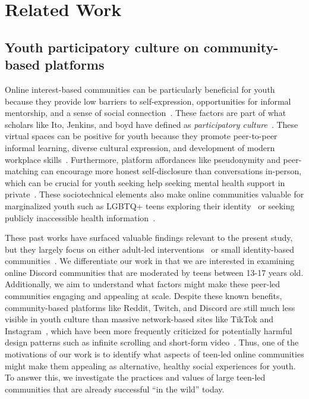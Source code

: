 \section{Related Work}
\subsection{Youth participatory culture on community-based platforms}
Online interest-based communities can be particularly beneficial for youth because they provide low barriers to self-expression, opportunities for informal mentorship, and a sense of social connection~\cite{ito2013hanging}. These factors are part of what scholars like Ito, Jenkins, and boyd have defined as \textit{participatory culture}~\cite{jenkins2015participatory}. These virtual spaces can be positive for youth because they promote peer-to-peer informal learning, diverse cultural expression, and development of modern workplace skills~\cite{ito2009living, fiesler2017growing, fields2014programming,brennan2010making, evans2017fanfiction}. Furthermore, platform affordances like pseudonymity and peer-matching can encourage more honest self-disclosure than conversations in-person, which can be crucial for youth seeking help seeking mental health support in private~\cite{bhattacharya2019teen, jin2023music, wadley2013participatory, fang2022peer}. These sociotechnical elements also make online communities valuable for marginalized youth such as LGBTQ+ teens exploring their identity~\cite{dym2019coming, mcinroy2022counter} or seeking publicly inaccessible health information~\cite{liang2020education}. 

These past works have surfaced valuable findings relevant to the present study, but they largely focus on either adult-led interventions~\cite{tekinbas2021designing,cramer2007everything} or small identity-based communities~\cite{kotut2022winds}. We differentiate our work in that we are interested in examining online Discord communities that are moderated by teens between 13-17 years old. Additionally, we aim to understand what factors might make these peer-led communities engaging and appealing at scale. Despite these known benefits, community-based platforms like Reddit, Twitch, and Discord are still much less visible in youth culture than massive network-based sites like TikTok and Instagram~\cite{gottfriend2023teens}, which have been more frequently criticized for potentially harmful design patterns such as infinite scrolling and short-form video~\cite{schellewald_understanding_2023, tabachnick_nebraska_2024}. Thus, one of the motivations of our work is to identify what aspects of teen-led online communities might make them appealing as alternative, healthy social experiences for youth. To answer this, we investigate the practices and values of large teen-led communities that are already successful ``in the wild'' today. 

